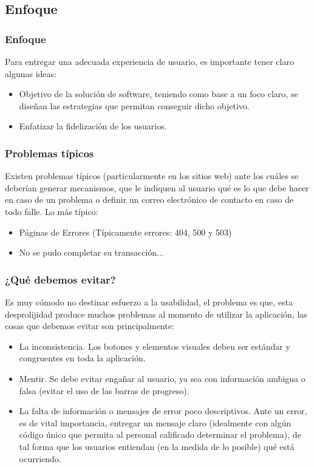 \documentclass[12pt]{beamer}
\begin{document}
\subsection{Enfoque}

\begin{frame}
 \frametitle{Enfoque}
 Para entregar una adecuada experiencia de usuario, es importante tener claro algunas ideas:
 \begin{itemize}
  \item<2-> Objetivo de la solución de software, teniendo como base a un foco claro, se diseñan las estrategias que permitan conseguir dicho objetivo.
  \item<3-> Enfatizar la fidelización de los usuarios.
 \end{itemize}
\end{frame}


\begin{frame}
 \frametitle{Problemas típicos}
 Existen problemas típicos (particularmente en los sitios web) ante los cuáles se deberían generar mecanismos, que le indiquen al usuario qué es lo que debe hacer en caso de un problema o definir un correo electrónico de contacto en caso de todo falle. Lo más típico:
 \begin{itemize}
  \item<2-> Páginas de Errores (Típicamente errores: 404, 500 y 503)
  \item<3-> No se pudo completar su transacción...
 \end{itemize}
\end{frame}


\begin{frame}
 \frametitle{¿Qué debemos evitar?}
 Es muy cómodo no destinar esfuerzo a la usabilidad, el problema es que, esta desprolijidad produce muchos problemas al momento de utilizar la aplicación, las cosas que debemos evitar son principalmente:
 \begin{itemize}
  \item<2-> La inconsistencia. Los botones y elementos visuales deben ser estándar y congruentes en toda la aplicación.
  \item<3-> Mentir. Se debe evitar engañar al usuario, ya sea con información ambigua o falsa (evitar el uso de las barras de progreso).
  \item<4-> La falta de información o mensajes de error poco descriptivos. Ante un error, es de vital importancia, entregar un mensaje claro (idealmente con algún código único que permita al personal calificado determinar el problema), de tal forma que los usuarios entiendan (en la medida de lo posible) qué está ocurriendo.
 \end{itemize}
\end{frame}
\end{document}
